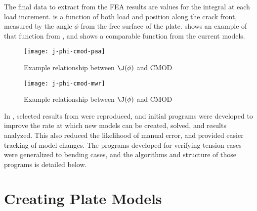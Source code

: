 The final data to extract from the FEA results are values for the \J integral at each load increment. \J is a function of both load and position along the crack front, measured by the angle \(\phi\) from the free surface of the plate.  shows an example of that function from \cite{allenwells2014}, and  shows a comparable function from the current models.

\begin{frame}
\begin{figure}[tbp]
\centering
\texttt{[image: j-phi-cmod-paa]}
\caption{\label{fig:j-phi-cmod-paa} Example relationship between \(\J(\phi)\) and CMOD \citep{allenwells2014}}
\end{figure}
\end{frame}

\begin{frame}
\begin{figure}[tbp]
\centering
\texttt{[image: j-phi-cmod-mwr]}
\caption{\label{fig:j-phi-cmod-mwr} Example relationship between \(\J(\phi)\) and CMOD}
\end{figure}
\end{frame}

%  
%  


In , selected results from \cite{allenwells2014} were reproduced, and initial programs were developed to improve the rate at which new models can be created, solved, and results analyzed.
This also reduced the likelihood of manual error, and provided easier tracking of model changes.
The programs developed for verifying tension cases were generalized to bending cases, and the algorithms and structure of those programs is detailed below.

\section{Creating Plate Models}
\label{sec:preprocess}

